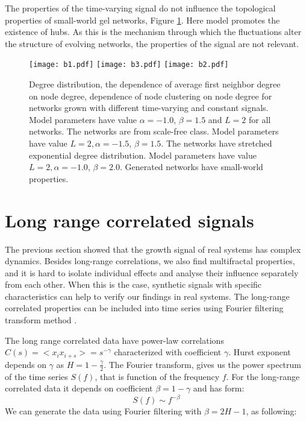The properties of the time-varying signal do not influence the topological properties of small-world gel networks, Figure \ref{fig:properties_net}. Here model promotes the existence of hubs. As this is the mechanism through which the fluctuations alter the structure of evolving networks, the properties of the signal are not relevant.   

\begin{figure}[H]
	\centering
	\texttt{[image: b1.pdf]}
	\texttt{[image: b3.pdf]}
	\texttt{[image: b2.pdf]}
	\caption[Structural properties of networks.]{Degree distribution, the dependence of average first neighbor degree on node degree, dependence of node clustering on node degree for networks grown with different time-varying and constant signals. Model parameters have value $\alpha=-1.0$, $\beta=1.5$  and $L=2$ for all networks. The networks are from scale-free class. Model parameters have value $L=2, \alpha=-1.5$, $\beta=1.5$. The networks have stretched exponential degree distribution. Model parameters have value $ L=2, \alpha=-1.0$, $\beta=2.0$. Generated networks have small-world properties.}
	\label{fig:properties_net}
\end{figure}

\section{Long range correlated signals}

The previous section showed that the growth signal of real systems has complex dynamics. Besides long-range correlations, we also find multifractal properties, and it is hard to isolate individual effects and analyse their influence separately from each other. When this is the case, synthetic signals with specific characteristics can help to verify our findings in real systems. The long-range correlated properties can be included into time series using Fourier filtering transform method \cite{makse1996method}. 

The long range correlated data have power-law correlations $C(s)= <x_i x_{i+s}> = s ^ {-\gamma}$ characterized with coefficient $\gamma$. Hurst exponent depends on $\gamma$ as  $H = 1- \frac{\gamma}{2}$. The Fourier transform, gives us the power spectrum of the time series $S(f)$, that is function of the frequency $f$. For the long-range correlated data it depends on coefficient $\beta = 1-\gamma$ and has form:
\begin{equation}
S(f) \sim f^{-\beta}
\end{equation}
We can generate the data using Fourier filtering with $\beta = 2H - 1$, as following:

